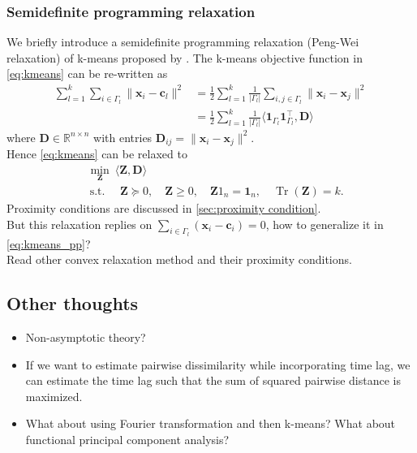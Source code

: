 		\subsubsection*{Semidefinite programming relaxation}
			We briefly introduce a semidefinite programming relaxation (Peng-Wei relaxation) of k-means proposed by \citet{Peng2005}.
			The k-means objective function in \eqref{eq:kmeans} can be re-written as
			\begin{align*}
			\sum_{l=1}^k\sum_{i\in\Gamma_l}\|\mathbf{x}_i- \mathbf{c}_l\|^2 &= \frac{1}{2}\sum_{l=1}^k \frac{1}{|\Gamma_l|}\sum_{i,j\in\Gamma_l}\|\mathbf{x}_i - \mathbf{x}_j\|^2\\
			&= \frac{1}{2}\sum_{l=1}^k\frac{1}{|\Gamma_l|}\langle \mathbf{1}_{\Gamma_l}\mathbf{1}_{\Gamma_l}^\top,\mathbf{D} \rangle
			\end{align*}
			where $\mathbf{D}\in \mathbb{R}^{n\times n}$ with entries $\mathbf{D}_{ij}=\|\mathbf{x}_i- \mathbf{x}_j\|^2$.
			\\
			Hence \eqref{eq:kmeans} can be relaxed to
			\begin{align*}
			&\min_{\mathbf{Z}}\ \langle \mathbf{Z},\mathbf{D}\rangle \qquad \\
			& \ \text{s.t. } \quad \mathbf{Z} \succeq 0, \quad \mathbf{Z} \geq 0, \quad \mathbf{Z} 1_{n}=\mathbf{1}_{n}, \quad \operatorname{Tr}(\mathbf{Z})=k.
			\end{align*}
		Proximity conditions are discussed in \ref{sec:proximity condition}.
		\\
		{\color{red} But this relaxation replies on $\sum_{i\in\Gamma_l}(\mathbf{x}_i- \mathbf{c}_i)=0$, how to generalize it in \eqref{eq:kmeans_pp}?}
		\\
		{\color{blue} Read other convex relaxation method and their proximity conditions.}
		
	\subsection{Other thoughts}
		\begin{itemize}
			\item Non-asymptotic theory?
			\item { If we want to estimate pairwise dissimilarity while incorporating time lag, we can estimate the time lag such that the sum of squared pairwise distance is maximized.}
			\item What about using Fourier transformation and then k-means? What about functional principal component analysis?
		\end{itemize}





